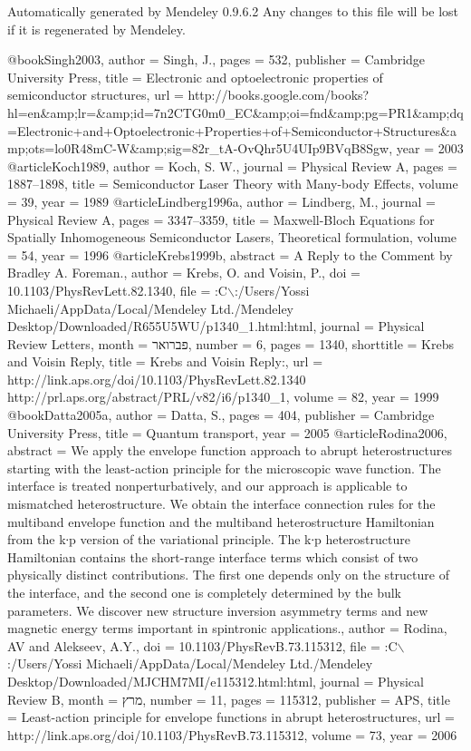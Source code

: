 Automatically generated by Mendeley 0.9.6.2
Any changes to this file will be lost if it is regenerated by Mendeley.

@book{Singh2003,
author = {Singh, J.},
pages = {532},
publisher = {Cambridge University Press},
title = {{Electronic and optoelectronic properties of semiconductor structures}},
url = {http://books.google.com/books?hl=en\&amp;lr=\&amp;id=7n2CTG0m0\_EC\&amp;oi=fnd\&amp;pg=PR1\&amp;dq=Electronic+and+Optoelectronic+Properties+of+Semiconductor+Structures\&amp;ots=lo0R48mC-W\&amp;sig=82r\_tA-OvQhr5U4UIp9BVqB8Sgw},
year = {2003}
}
@article{Koch1989,
author = {Koch, S. W.},
journal = {Physical Review A},
pages = {1887--1898},
title = {{Semiconductor Laser Theory with Many-body Effects}},
volume = {39},
year = {1989}
}
@article{Lindberg1996a,
author = {Lindberg, M.},
journal = {Physical Review A},
pages = {3347--3359},
title = {{Maxwell-Bloch Equations for Spatially Inhomogeneous Semiconductor Lasers, Theoretical formulation}},
volume = {54},
year = {1996}
}
@article{Krebs1999b,
abstract = {A Reply to the Comment by Bradley A. Foreman.},
author = {Krebs, O. and Voisin, P.},
doi = {10.1103/PhysRevLett.82.1340},
file = {:C$\backslash$:/Users/Yossi Michaeli/AppData/Local/Mendeley Ltd./Mendeley Desktop/Downloaded/R655U5WU/p1340\_1.html:html},
journal = {Physical Review Letters},
month = {פברואר},
number = {6},
pages = {1340},
shorttitle = {Krebs and Voisin Reply},
title = {{Krebs and Voisin Reply:}},
url = {http://link.aps.org/doi/10.1103/PhysRevLett.82.1340 http://prl.aps.org/abstract/PRL/v82/i6/p1340\_1},
volume = {82},
year = {1999}
}
@book{Datta2005a,
author = {Datta, S.},
pages = {404},
publisher = {Cambridge University Press},
title = {{Quantum transport}},
year = {2005}
}
@article{Rodina2006,
abstract = {We apply the envelope function approach to abrupt heterostructures starting with the least-action principle for the microscopic wave function. The interface is treated nonperturbatively, and our approach is applicable to mismatched heterostructure. We obtain the interface connection rules for the multiband envelope function and the multiband heterostructure Hamiltonian from the k∙p version of the variational principle. The k∙p heterostructure Hamiltonian contains the short-range interface terms which consist of two physically distinct contributions. The first one depends only on the structure of the interface, and the second one is completely determined by the bulk parameters. We discover new structure inversion asymmetry terms and new magnetic energy terms important in spintronic applications.},
author = {Rodina, AV and Alekseev, A.Y.},
doi = {10.1103/PhysRevB.73.115312},
file = {:C$\backslash$:/Users/Yossi Michaeli/AppData/Local/Mendeley Ltd./Mendeley Desktop/Downloaded/MJCHM7MI/e115312.html:html},
journal = {Physical Review B},
month = {מרץ},
number = {11},
pages = {115312},
publisher = {APS},
title = {{Least-action principle for envelope functions in abrupt heterostructures}},
url = {http://link.aps.org/doi/10.1103/PhysRevB.73.115312},
volume = {73},
year = {2006}
}
